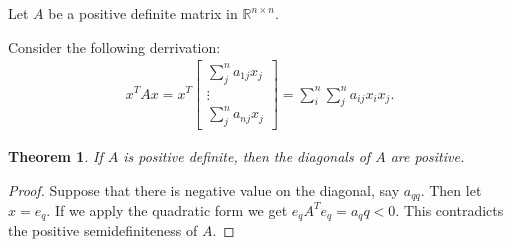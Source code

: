 \documentclass[letter]{article}
\newtheorem{theorem}{Theorem}
\newenvironment{menumerate}{%
  \edef\backupindent{\the\parindent}%
  \enumerate%
  \setlength{\parindent}{\backupindent}%
}{\endenumerate}
\begin{document}
\begin{menumerate}
\newpage
\item Let $A$ be a positive definite matrix in $\mathbb{R}^{n\times n}.$
  \begin{menumerate}
    \item Consider the following derrivation:
    \begin{equation}
      \begin{aligned}
          x^TAx = x^T \begin{bmatrix}
            \sum_j^n  a_{1j}x_j \\
            \vdots\\
            \sum_j^n a_{nj}x_j
          \end{bmatrix}  = \sum_i^n \sum_j^n a_{ij}x_ix_j.
       \end{aligned}   
    \end{equation}
    \item 
    \begin{theorem}
      If $A$ is positive definite, then the diagonals of $A$ are positive.
    \end{theorem}
    \begin{proof}
      Suppose that there is negative value on the diagonal, say $a_{qq}.$
      Then let $x = e_{q}.$ If we apply the quadratic form we get $e_qA^Te_q = a_qq < 0.$ 
      This contradicts the positive semidefiniteness of $A.$
    \end{proof}
  \end{menumerate}

\newpage


\end{menumerate}
\end{document}
